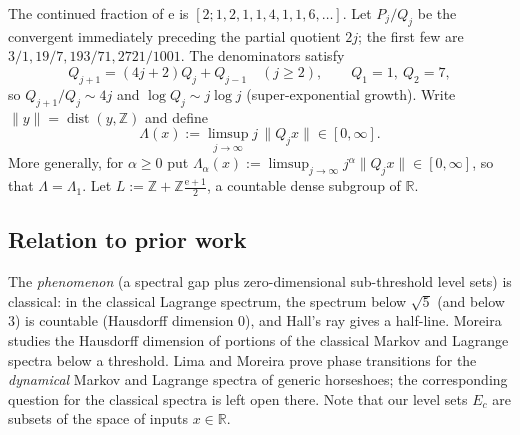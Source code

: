 \documentclass[11pt]{article}
\theoremstyle{definition}
\theoremstyle{remark}
\newcommand{\R}{\mathbb{R}}
\newcommand{\Z}{\mathbb{Z}}
\newcommand{\ee}{\mathrm{e}}
\newcommand{\dist}{\operatorname{dist}}
\newcommand{\Lam}{\Lambda}
\begin{document}
The continued fraction of $\ee$ is $[2;1,2,1,1,4,1,1,6,\dots]$. Let $P_j/Q_j$
be the convergent immediately preceding the partial quotient $2j$; the first
few are $3/1,19/7,193/71,2721/1001$. The denominators satisfy
\begin{equation}\label{eq:rec}
Q_{j+1}=(4j+2)Q_j+Q_{j-1}\quad(j\ge2),\qquad Q_1=1,\ Q_2=7,
\end{equation}
so $Q_{j+1}/Q_j\sim 4j$ and $\log Q_j\sim j\log j$ (super-exponential growth).
Write $\|y\|=\dist(y,\Z)$ and define
\[
\Lam(x):=\limsup_{j\to\infty} j\,\|Q_j x\|\in[0,\infty].
\]
More generally, for $\alpha\ge0$ put
$\Lam_\alpha(x):=\limsup_{j\to\infty} j^\alpha\|Q_j x\|\in[0,\infty]$,
so that $\Lam=\Lam_1$.
Let $L:=\Z+\Z\frac{\ee+1}{2}$, a countable dense subgroup of $\R$.

\subsection{Relation to prior work}\label{sec:prior}

The \emph{phenomenon} (a spectral gap plus zero-dimensional sub-threshold level
sets) is classical: in the classical Lagrange spectrum, the spectrum below
$\sqrt5$ (and below $3$) is countable (Hausdorff dimension $0$), and Hall's ray
gives a half-line. Moreira \cite{Moreira} studies the Hausdorff dimension of
portions of the classical Markov and Lagrange spectra below a threshold. Lima
and Moreira \cite{LimaMoreira} prove phase transitions for the \emph{dynamical}
Markov and Lagrange spectra of generic horseshoes; the corresponding question
for the classical spectra is left open there. Note that our level sets $E_c$ are
subsets of the space of inputs $x\in\R$.
\end{document}
